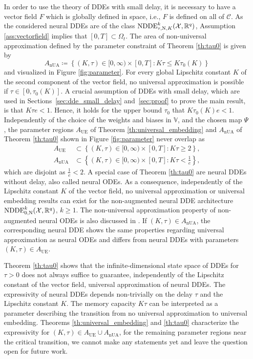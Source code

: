 \documentclass[10pt]{article}
\numberwithin{equation}{section}
\begin{document}
	In order to use the theory of DDEs with small delay, it is necessary to have a vector field $F$ which is globally defined in space, i.e., $F$ is defined on all of $\mathcal{C}$. As the considered neural DDEs are of the class $\textup{NDDE}_{\tau,\textup{N},K}^k(\mathcal{X},\mathbb{R}^q)$, Assumption \ref{ass:vectorfield} implies that $[0,T]\subset \Omega_t$.
	The area of non-universal approximation defined by the parameter constraint of Theorem \ref{th:tau0} is given by
	\begin{equation*}
		A_\text{nUA} \coloneqq \left\{(K,\tau) \in [0,\infty) \times [0,T]: K \tau \leq K \tau_0(K)\right\}
	\end{equation*}
	and visualized in Figure \ref{fig:parameter}. For every global Lipschitz constant $K$ of the second component of the vector field, no universal approximation is possible if $\tau \in [0,\tau_0(K)]$. A crucial assumption of DDEs with small delay, which are used in Sections~\ref{sec:dde_small_delay} and~\ref{sec:proof} to prove the main result, is that $K\tau e<1$. Hence, it holds for the upper bound $\tau_0$ that $K \tau_0(K) e<1$. Independently of the choice of the weights and biases in $\mathbb{V}$, and the chosen map $\Psi$, the parameter regions $A_\text{UE} $ of Theorem \ref{th:universal_embedding} and 	$A_\text{nUA}$ of Theorem  \ref{th:tau0} shown in Figure \ref{fig:parameter} never overlap as
	\begin{align*}
		A_\text{UE} &\subset \left\{(K,\tau) \in [0,\infty) \times [0,T]: K \tau \geq 2\right\}, \\
		A_\text{nUA} & \subset \left\{(K,\tau) \in [0,\infty) \times [0,T]: K \tau < \tfrac{1}{e}\right\},
	\end{align*}
	which are disjoint as $\frac{1}{e}<2$. 	A special case of Theorem \ref{th:tau0} are neural DDEs without delay, also called neural ODEs. As a consequence, independently of the Lipschitz constant $K$ of the vector field, no universal approximation or universal embedding results can exist for the non-augmented neural DDE architecture $\textup{NDDE}^k_{0,\text{N}}(\mathcal{X},\mathbb{R}^q)$, $k \geq 1$. The non-universal approximation property of non-augmented neural ODEs is also discussed in \cite{Kidger2022,Kuehn2023}. If $(K,\tau)\in A_\text{nUA}$, the corresponding neural DDE shows the same properties regarding universal approximation as neural ODEs and differs from neural DDEs with parameters $(K,\tau)\in A_\text{UE}$. 
	
	Theorem \ref{th:tau0} shows that the infinite-dimensional state space of DDEs for $\tau>0$ does not always suffice to guarantee, independently of the Lipschitz constant of the vector field, universal approximation of neural DDEs. The expressivity of neural DDEs depends non-trivially on the delay $\tau$ and the Lipschitz constant $K$. The memory capacity $K\tau$ can be interpreted as a parameter describing the transition from no universal approximation to universal embedding. Theorems \ref{th:universal_embedding} and \ref{th:tau0} characterize the expressivity for $(K,\tau) \in 	A_\text{UE} \cup A_\text{nUA}$, for the remaining parameter regions near the critical transition, we cannot make any statements yet and leave the question open for future work. 
	
\end{document}
